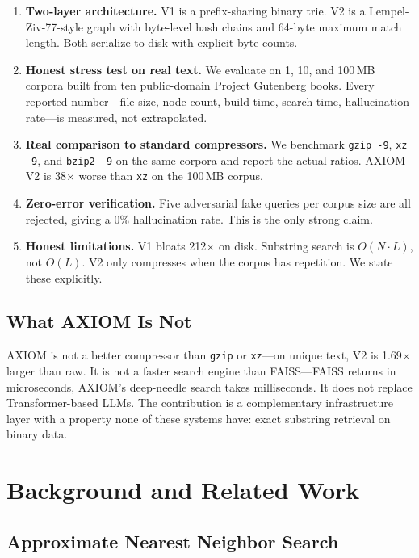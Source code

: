 \documentclass[conference]{IEEEtran}
\begin{document}
\begin{enumerate}
\item \textbf{Two-layer architecture.} V1 is a prefix-sharing binary trie. V2 is a Lempel-Ziv-77-style graph with byte-level hash chains and 64-byte maximum match length. Both serialize to disk with explicit byte counts.
\item \textbf{Honest stress test on real text.} We evaluate on 1, 10, and 100\,MB corpora built from ten public-domain Project Gutenberg books. Every reported number---file size, node count, build time, search time, hallucination rate---is measured, not extrapolated.
\item \textbf{Real comparison to standard compressors.} We benchmark \texttt{gzip -9}, \texttt{xz -9}, and \texttt{bzip2 -9} on the same corpora and report the actual ratios. AXIOM V2 is 38$\times$ worse than \texttt{xz} on the 100\,MB corpus.
\item \textbf{Zero-error verification.} Five adversarial fake queries per corpus size are all rejected, giving a 0\% hallucination rate. This is the only strong claim.
\item \textbf{Honest limitations.} V1 bloats 212$\times$ on disk. Substring search is $O(N{\cdot}L)$, not $O(L)$. V2 only compresses when the corpus has repetition. We state these explicitly.
\end{enumerate}

\subsection{What AXIOM Is Not}

AXIOM is not a better compressor than \texttt{gzip} or \texttt{xz}---on unique text, V2 is 1.69$\times$ larger than raw. It is not a faster search engine than FAISS---FAISS returns in microseconds, AXIOM's deep-needle search takes milliseconds. It does not replace Transformer-based LLMs. The contribution is a complementary infrastructure layer with a property none of these systems have: exact substring retrieval on binary data.

\section{Background and Related Work}

\subsection{Approximate Nearest Neighbor Search}
\end{document}
